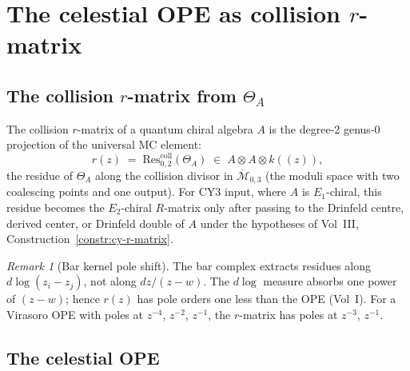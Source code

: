 \documentclass[11pt]{article}
\theoremstyle{definition}
\theoremstyle{remark}
\newtheorem{remark}[theorem]{Remark}
\newcommand{\cM}{\mathcal{M}}
\newcommand{\Res}{\mathrm{Res}}
\begin{document}
\section{The celestial OPE as collision $r$-matrix}
\label{sec:celestial-ope-r-matrix}

\subsection{The collision $r$-matrix from $\Theta_A$}

The collision $r$-matrix of a quantum chiral algebra $A$ is the
degree-2 genus-0 projection of the universal MC element:
\begin{equation}\label{eq:r-matrix-definition}
r(z)
\;=\;
\Res^{\mathrm{coll}}_{0,2}(\Theta_A)
\;\in\;
A \otimes A \otimes k((z)),
\end{equation}
the residue of $\Theta_A$ along the collision divisor in
$\overline{\cM}_{0,3}$ (the moduli space with two coalescing points
and one output). For CY3 input, where $A$ is $E_1$-chiral, this residue
becomes the $E_2$-chiral $R$-matrix only after passing to the Drinfeld
centre, derived center, or Drinfeld double of $A$ under the hypotheses
of Vol~III, Construction~\ref*{constr:cy-r-matrix}.

\begin{remark}[Bar kernel pole shift]
\label{rem:pole-shift}
The bar complex extracts residues along $d\log(z_i - z_j)$, not
along $dz/(z-w)$. The $d\log$ measure absorbs one power of
$(z-w)$; hence $r(z)$ has pole orders one less than the OPE
(Vol~I). For a Virasoro OPE with poles at $z^{-4}$,
$z^{-2}$, $z^{-1}$, the $r$-matrix has poles at $z^{-3}$, $z^{-1}$.
\end{remark}

\subsection{The celestial OPE}
\end{document}
